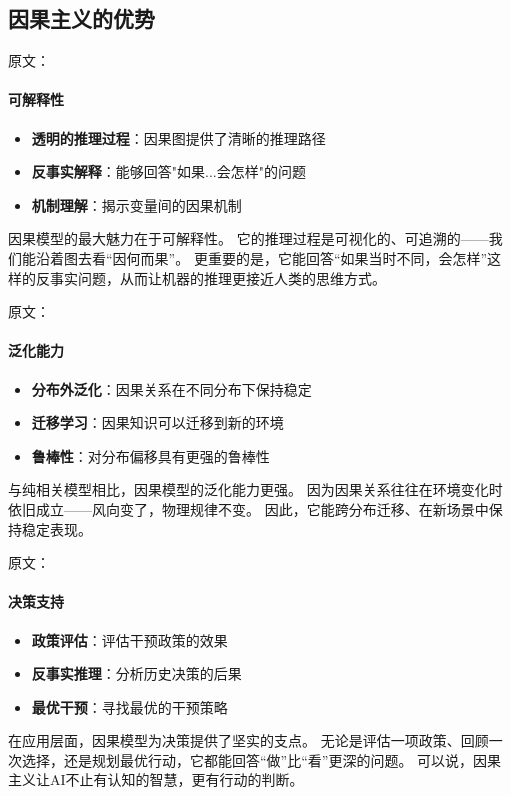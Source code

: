 \subsection{因果主义的优势}

原文：
\paragraph{可解释性}
\begin{itemize}
\item \textbf{透明的推理过程}：因果图提供了清晰的推理路径
\item \textbf{反事实解释}：能够回答"如果...会怎样"的问题
\item \textbf{机制理解}：揭示变量间的因果机制
\end{itemize}
因果模型的最大魅力在于可解释性。  
它的推理过程是可视化的、可追溯的——我们能沿着图去看“因何而果”。  
更重要的是，它能回答“如果当时不同，会怎样”这样的反事实问题，从而让机器的推理更接近人类的思维方式。

原文：
\paragraph{泛化能力}
\begin{itemize}
\item \textbf{分布外泛化}：因果关系在不同分布下保持稳定
\item \textbf{迁移学习}：因果知识可以迁移到新的环境
\item \textbf{鲁棒性}：对分布偏移具有更强的鲁棒性
\end{itemize}
与纯相关模型相比，因果模型的泛化能力更强。  
因为因果关系往往在环境变化时依旧成立——风向变了，物理规律不变。  
因此，它能跨分布迁移、在新场景中保持稳定表现。

原文：
\paragraph{决策支持}
\begin{itemize}
\item \textbf{政策评估}：评估干预政策的效果
\item \textbf{反事实推理}：分析历史决策的后果
\item \textbf{最优干预}：寻找最优的干预策略
\end{itemize}
在应用层面，因果模型为决策提供了坚实的支点。  
无论是评估一项政策、回顾一次选择，还是规划最优行动，它都能回答“做”比“看”更深的问题。  
可以说，因果主义让AI不止有认知的智慧，更有行动的判断。

